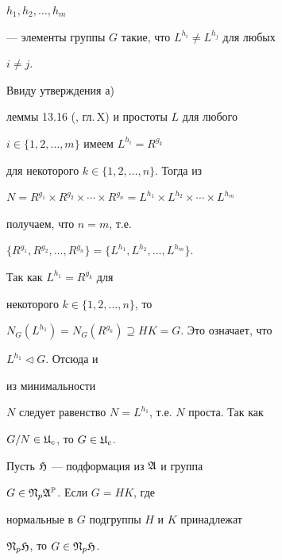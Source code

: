 \begin{pf}
$h_1,h_2,\dotsc,h_m$


--- элементы группы $G$ такие, что $L^{h_i}\ne L^{h_j}$ для любых


$i\ne j$.


Ввиду утверждения а)


леммы 13.16 (\cite{Hup2}, гл.\,X) и простоты $L$ для любого


$i\in\{1,2,\dotsc,m\}$ имеем $L^{h_i}=R^{g_k}$


для некоторого $k\in\{1,2,\dotsc,n\}$. Тогда из


$N=R^{g_1}\times R^{g_2}\times\dotsb\times R^{g_n}=


L^{h_1}\times L^{h_2}\times\dotsb\times L^{h_m}$


получаем, что $n=m$, т.е.


$\{R^{g_1},R^{g_2},\dotsc,R^{g_n}\}=


\{L^{h_1},L^{h_2},\dotsc,L^{h_m}\}$.


Так как $L^{h_1}=R^{g_k}$ для


некоторого $k\in\{1,2,\dotsc,n\}$, то


$N_G(L^{h_1})=N_G(R^{g_k})\supseteq HK=G$. Это означает, что


$L^{h_1}\vartriangleleft G$. Отсюда и


из минимальности


$N$ следует равенство $N=L^{h_1}$, т.е. $N$ проста. Так как


$G/N\in\frak U_c$, то $G\in \frak U_c$.


\end{pf}





\begin{lem}


Пусть $\frak H$ --- подформация из $\frak A$ и группа


$G\in\frak N_p\frak A^{\Bbb P}$. Если $G=HK$, где


нормальные в $G$ подгруппы $H$ и $K$ принадлежат


$\frak N_p\frak H$, то $G\in\frak N_p\frak H$.


\end{lem}





